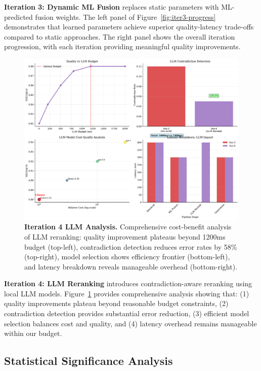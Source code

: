 \documentclass[letterpaper]{article}
\begin{document}
\textbf{Iteration 3: Dynamic ML Fusion} replaces static parameters with ML-predicted fusion weights. The left panel of Figure~\ref{fig:iter3-progress} demonstrates that learned parameters achieve superior quality-latency trade-offs compared to static approaches. The right panel shows the overall iteration progression, with each iteration providing meaningful quality improvements.

\begin{figure}[t]
\centering
\includegraphics[width=\textwidth]{figures/iter4_llm_cost_quality_tradeoff}
\caption{\textbf{Iteration 4 LLM Analysis.} Comprehensive cost-benefit analysis of LLM reranking: quality improvement plateaus beyond 1200ms budget (top-left), contradiction detection reduces error rates by 58\% (top-right), model selection shows efficiency frontier (bottom-left), and latency breakdown reveals manageable overhead (bottom-right).}
\label{fig:iter4-llm}
\end{figure}

\textbf{Iteration 4: LLM Reranking} introduces contradiction-aware reranking using local LLM models. Figure~\ref{fig:iter4-llm} provides comprehensive analysis showing that: (1) quality improvements plateau beyond reasonable budget constraints, (2) contradiction detection provides substantial error reduction, (3) efficient model selection balances cost and quality, and (4) latency overhead remains manageable within our budget.

\subsection{Statistical Significance Analysis}
\end{document}
